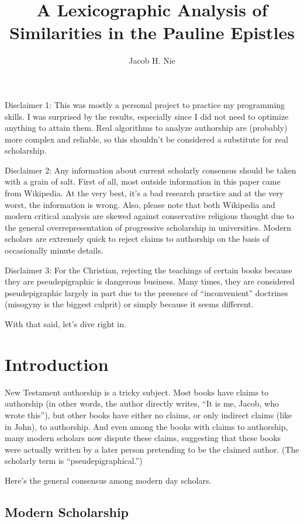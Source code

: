 \documentclass[12pt,letterpaper]{article}
\author{Jacob H. Nie}
\title{A Lexicographic Analysis of Similarities in the Pauline Epistles}
\begin{document}
\maketitle
\tableofcontents

\break


Disclaimer 1: This was mostly a personal project to practice my programming skills.  I was surprised by the results, especially since I did not need to optimize anything to attain them.  Real algorithms to analyze authorship are (probably) more complex and reliable, so this shouldn't be considered a substitute for real scholarship.  

Disclaimer 2: Any information about current scholarly consensus should be taken with a grain of salt.  First of all, most outside information in this paper came from Wikipedia.  At the very best, it's a bad research practice and at the very worst, the information is wrong.  Also, please note that both Wikipedia and modern critical analysis are skewed against conservative religious thought due to the general overrepresentation of progressive scholarship in universities.  Modern scholars are extremely quick to reject claims to authorship on the basis of occasionally minute details.  

Disclaimer 3: For the Christian, rejecting the teachings of certain books because they are pseudepigraphic is dangerous business.  Many times, they are considered pseudepigraphic largely in part due to the presence of ``inconvenient'' doctrines (misogyny is the biggest culprit) or simply because it seems different.  

With that said, let's dive right in.  
\section{Introduction}
New Testament authorship is a tricky subject.  Most books have claims to authorship (in other words, the author directly writes, ``It is me, Jacob, who wrote this''), but other books have either no claims, or only indirect claims (like in John), to authorship.  And even among the books with claims to authorship, many modern scholars now dispute these claims, suggesting that these books were actually written by a later person pretending to be the claimed author.  (The scholarly term is ``pseudepigraphical.'')  

Here's the general consensus among modern day scholars.

\subsection{Modern Scholarship}
\end{document}
